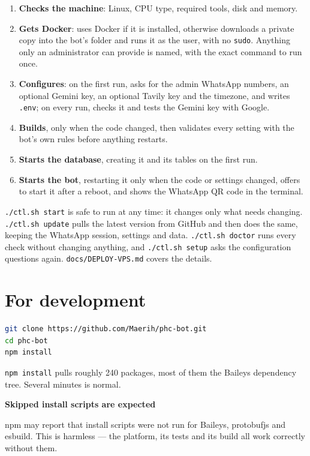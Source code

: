 \documentclass[11pt,a4paper]{report}
\newenvironment{callout}[1]
  {\begin{framed}\noindent\textbf{\textcolor{phcWarnInk}{#1}}\par\vspace{3pt}\small}
  {\end{framed}}
\newcommand{\dash}{---}
\begin{document}
\begin{enumerate}
  \item \textbf{Checks the machine}: Linux, CPU type, required tools, disk
        and memory.
  \item \textbf{Gets Docker}: uses Docker if it is installed, otherwise
        downloads a private copy into the bot's folder and runs it as the
        user, with no \texttt{sudo}. Anything only an administrator can
        provide is named, with the exact command to run once.
  \item \textbf{Configures}: on the first run, asks for the admin WhatsApp
        numbers, an optional Gemini key, an optional Tavily key and the
        timezone, and writes \texttt{.env}; on every run, checks it and
        tests the Gemini key with Google.
  \item \textbf{Builds}, only when the code changed, then validates every
        setting with the bot's own rules before anything restarts.
  \item \textbf{Starts the database}, creating it and its tables on the first
        run.
  \item \textbf{Starts the bot}, restarting it only when the code or settings
        changed, offers to start it after a reboot, and shows the WhatsApp QR
        code in the terminal.
\end{enumerate}

\texttt{./ctl.sh start} is safe to run at any time: it changes only what needs
changing. \texttt{./ctl.sh update} pulls the latest version from GitHub and
then does the same, keeping the WhatsApp session, settings and data.
\texttt{./ctl.sh doctor} runs every check without changing anything, and
\texttt{./ctl.sh setup} asks the configuration questions again.
\texttt{docs/DEPLOY-VPS.md} covers the details.

\section{For development}

\begin{lstlisting}[language=bash]
git clone https://github.com/Maerih/phc-bot.git
cd phc-bot
npm install
\end{lstlisting}

\texttt{npm install} pulls roughly 240 packages, most of them the Baileys
dependency tree. Several minutes is normal.

\begin{callout}{Skipped install scripts are expected}
npm may report that install scripts were not run for Baileys, protobufjs and
esbuild. This is harmless \dash{} the platform, its tests and its build all work
correctly without them.
\end{callout}
\end{document}
